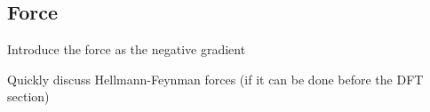 \subsection{Force}
\label{sec:force}

\bit
\item Introduce the force as the negative gradient
\item Quickly discuss Hellmann-Feynman forces (if it can be done before the DFT section)
\eit
